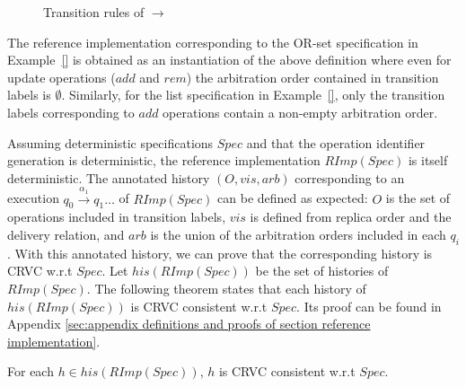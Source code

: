 \begin{figure}[ht]
\caption{Transition rules of $\rightarrow$}
\label{fig:transition rules of RImpSpec}
\end{figure}

The reference implementation corresponding to the OR-set specification in Example~\ref{} is obtained as an instantiation of the above definition where even for update operations ($\mathit{add}$ and $\mathit{rem}$) the arbitration order contained in transition labels is $\emptyset$. Similarly, for the list specification in Example~\ref{}, only the transition labels corresponding to $\mathit{add}$ operations contain a non-empty arbitration order.

%
%
%
%

Assuming deterministic specifications $\mathit{Spec}$ and that the operation identifier generation is deterministic, the reference implementation $\mathit{RImp}(\mathit{Spec})$ is itself deterministic.
The annotated history $(O,\mathit{vis},\mathit{arb})$ corresponding to an execution $q_0 {\xrightarrow{\alpha_1}} q_1 \ldots$ of $\mathit{RImp}(\mathit{Spec})$ can be defined as expected: $O$ is the set of operations included in transition labels, $\mathit{vis}$ is defined from replica order and the delivery relation, and $\mathit{arb}$ is the union of the arbitration orders included in each $q_i$. With this annotated history, we can prove that the corresponding history is CRVC w.r.t $\mathit{Spec}$. Let $\mathit{his}(\mathit{RImp}(\mathit{Spec}))$ be the set of histories of $\mathit{RImp}(\mathit{Spec})$. The following theorem states that each history of $\mathit{his}(\mathit{RImp}(\mathit{Spec}))$ is CRVC consistent w.r.t $\mathit{Spec}$. Its proof can be found in Appendix \ref{sec:appendix definitions and proofs of section reference implementation}.

\begin{theorem}
\label{theorem:histories of reference implementation are SRV consistent}
For each $h \in \mathit{his}(\mathit{RImp}(\mathit{Spec}))$, $h$ is CRVC consistent w.r.t $\mathit{Spec}$.
\end{theorem}


